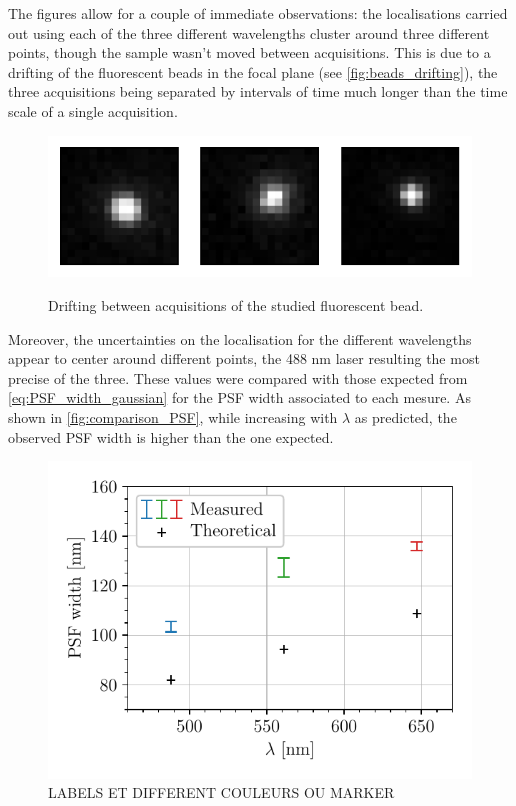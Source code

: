 The figures allow for a couple of immediate observations:
the localisations carried out using each of the three different wavelengths cluster around three different points, though the sample wasn't moved between acquisitions.
This is due to a drifting of the fluorescent beads in the focal plane (see \autoref{fig:beads_drifting}), the three acquisitions being separated by intervals of time much longer than the time scale of a single acquisition.
\begin{figure}
    \centering
    {\includegraphics[scale=1]{figures/beads_drifting.pdf}}
    \caption{Drifting between acquisitions of the studied fluorescent bead.}
    \label{fig:beads_drifting}
\end{figure}
Moreover, the uncertainties on the localisation for the different wavelengths appear to center around different points, the 488 nm laser resulting the most precise of the three.
These values were compared with those expected from \autoref{eq:PSF_width_gaussian} for the PSF width associated to each mesure.
As shown in \autoref{fig:comparison_PSF}, while increasing with $\lambda$ as predicted,
the observed PSF width is higher than the one expected.
\begin{figure}[htbp]
    \centering
    \includegraphics[scale=1]{figures/comparison_PSF.pdf}
    \caption{LABELS ET DIFFERENT COULEURS OU MARKER}
    \label{fig:comparison_PSF}
\end{figure}


